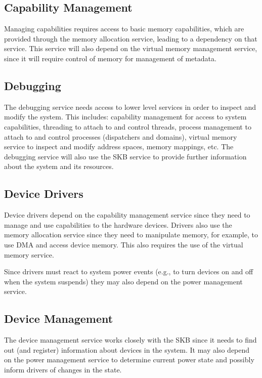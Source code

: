 \documentclass[a4paper,twoside]{report} %
\begin{document}
\subsection{Capability Management}

Managing capabilities requires access to basic memory capabilities,
which are provided through the memory allocation service, leading to a
dependency on that service.  This service will also depend on the
virtual memory management service, since it will require control of
memory for management of metadata.

\subsection{Debugging}

The debugging service needs access to lower level services in order to
inspect and modify the system.  This includes: capability management
for access to system capabilities, threading to attach to and control
threads, process management to attach to and control processes
(dispatchers and domains), virtual memory service to inspect and
modify address spaces, memory mappings, etc.  The debugging service
will also use the SKB service to provide further information about the
system and its resources.

\subsection{Device Drivers}

Device drivers depend on the capability management service since they
need to manage and use capabilities to the hardware devices. Drivers
also use the memory allocation service since they need to manipulate
memory, for example, to use DMA and access device memory.   This also
requires the use of the virtual memory service.

Since drivers must react to system power events (e.g., to turn devices
on and off when the system suspends) they may also depend on the power
management service.

\subsection{Device Management}

The device management service works closely with the SKB since it
needs to find out (and register) information about devices in the
system. It may also depend on the power management service to
determine current power state and possibly inform drivers of changes
in the state.  
\end{document}
